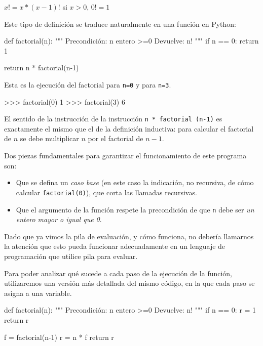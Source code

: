 $x! = x * (x-1)!$ si $x>0$, $0! = 1$

Este tipo de definición se traduce naturalmente en una función en Python:

\begin{codigo-python-sn}
def factorial(n):
    """ Precondición: n entero >=0
        Devuelve: n! """
    if n == 0:
        return 1

    return n * factorial(n-1)
\end{codigo-python-sn}

Esta es la ejecución del factorial para \lstinline!n=0! y para
\lstinline!n=3!.

\begin{codigo-python-sn}
>>> factorial(0)
1
>>> factorial(3)
6
\end{codigo-python-sn}

El sentido de la instrucción de la instrucción
\lstinline|n * factorial (n-1)| es exactamente el mismo que el de la
definición inductiva: para calcular el factorial de $n$ se debe multiplicar
$n$ por el factorial de $n-1$.

Dos piezas fundamentales para garantizar el funcionamiento de este programa
son:

\begin{itemize}
\item Que se defina un {\it caso base} (en este caso la indicación, no recursiva,
de cómo calcular \lstinline|factorial(0)|), que corta las llamadas recursivas.

\item Que el argumento de la función respete la precondición
de que \lstinline!n! debe ser {\it un entero mayor o igual que 0}.
\end{itemize}

Dado que ya vimos la pila de evaluación, y cómo funciona, no debería
llamarnos la atención que esto pueda funcionar adecuadamente en un lenguaje
de programación que utilice pila para evaluar.

Para poder analizar qué sucede a cada paso de la ejecución de la función,
utilizaremos una versión más detallada del mismo código, en la que cada
paso se asigna a una variable.

\begin{codigo-python-sn}
def factorial(n):
    """ Precondición: n entero >=0
        Devuelve: n! """
    if n == 0:
        r = 1
        return r

    f = factorial(n-1)
    r = n * f
    return r
\end{codigo-python-sn}

